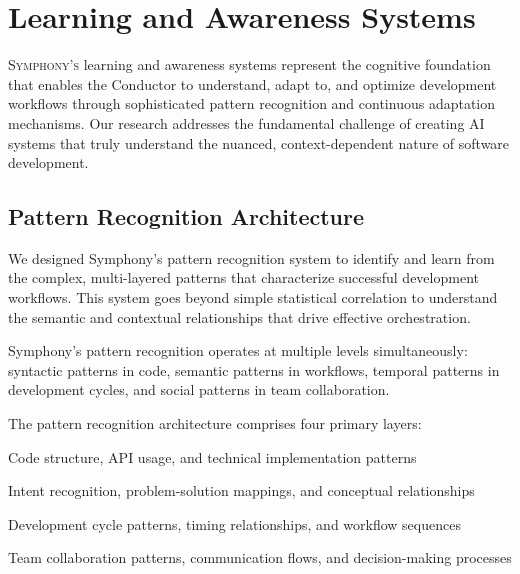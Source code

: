 
\section*{Learning and Awareness Systems}

\vspace{0.5cm}
\lettrine{S}{ymphony's} learning and awareness systems represent the cognitive foundation that enables the Conductor to understand, adapt to, and optimize development workflows through sophisticated pattern recognition and continuous adaptation mechanisms. Our research addresses the fundamental challenge of creating AI systems that truly understand the nuanced, context-dependent nature of software development.

\subsection*{Pattern Recognition Architecture}

We designed Symphony's pattern recognition system to identify and learn from the complex, multi-layered patterns that characterize successful development workflows. This system goes beyond simple statistical correlation to understand the semantic and contextual relationships that drive effective orchestration.

\begin{infobox}[title=Hierarchical Pattern Learning]
Symphony's pattern recognition operates at multiple levels simultaneously: syntactic patterns in code, semantic patterns in workflows, temporal patterns in development cycles, and social patterns in team collaboration.
\end{infobox}

The pattern recognition architecture comprises four primary layers:

\begin{description}[leftmargin=4cm,labelwidth=3.5cm]
    \item[\textbf{Syntactic Layer}] Code structure, API usage, and technical implementation patterns
    \item[\textbf{Semantic Layer}] Intent recognition, problem-solution mappings, and conceptual relationships
    \item[\textbf{Temporal Layer}] Development cycle patterns, timing relationships, and workflow sequences
    \item[\textbf{Social Layer}] Team collaboration patterns, communication flows, and decision-making processes
\end{description}

